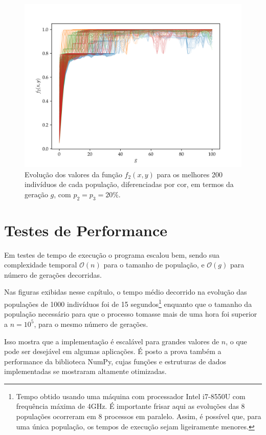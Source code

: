 \begin{figure}[p]
  \centering
  \includegraphics[width=\textwidth]{imagens/high_prob/evolution_near_gaussians.png}
  \caption{
    Evolução dos valores da função $ f_2(x,y) $ para os
    melhores 200 indivíduos de cada população, diferenciadas por cor, em termos da geração $g$,
    com $ p_2 = p_3 = 20\% $.
  }
  \label{fig:evolution_near_gaussians_mut_20}
\end{figure}

\section{Testes de Performance}

Em testes de tempo de execução o programa escalou bem, sendo sua complexidade temporal $\mathcal{O}(n)$ para o
tamanho de população, e $\mathcal{O}(g)$ para número de gerações decorridas. 

Nas figuras exibidas nesse capítulo, o tempo médio decorrido na evolução das populações de 1000 indivíduos
foi de 15 segundos\footnote{
  Tempo obtido usando uma máquina com processador Intel i7-8550U com frequência máxima de 4GHz.
  É importante frisar aqui as evoluções das 8 populações ocorreram em 8 processos em paralelo.
  Assim, é possível que, para uma única população, os tempos de execução sejam ligeiramente menores.
} enquanto que o tamanho da população necessário para que o processo tomasse mais de uma hora foi
superior a $n = 10^5$, para o mesmo número de gerações.

Isso mostra que a implementação é escalável para grandes valores de $n$, o que pode ser desejável em
algumas aplicações. É posto a prova também a performance da biblioteca NumPy, cujas funções e estruturas
de dados implementadas se mostraram altamente otimizadas.